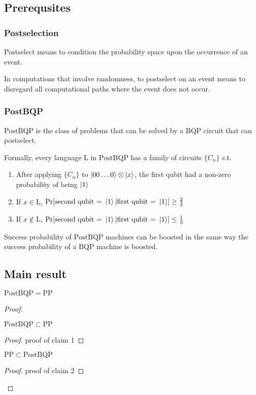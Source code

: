\documentclass[../main.tex]{subfiles}
\begin{document}
\subsection{Prerequsites}

\subsubsection{Postselection}

Postselect means to condition the probability space upon the occurrence of an event.

\noindent In computations that involve randomness, to postselect on an event means to disregard all computational paths where the event does not occur.

\subsubsection{PostBQP}

$\mathrm{PostBQP}$ is the class of problems that can be solved by a $\mathrm{BQP}$ circuit that can postselect.

Formally, every language $\mathrm{L}$ in $\mathrm{PostBQP}$ has a family of circuits $\{C_n\}$ s.t.
\begin{enumerate}
	\item After applying $\{C_n\}$ to $\ket{00\hdots 0}\otimes\ket{x}$, the first qubit had a non-zero probability of being $\ket{1}$
	\item If $x \in \mathrm{L}$, $\mathrm{Pr}[\text{second qubit = } \ket{1} | \text{first qubit = } \ket{1}] \ge \frac{2}{3}$
	\item If $x \not\in \mathrm{L}$, $\mathrm{Pr}[\text{second qubit = } \ket{1} | \text{first qubit = } \ket{1}] \le \frac{1}{3}$
\end{enumerate}

\noindent Success probability of $\mathrm{PostBQP}$ machines can be boosted in the same way the success probability of a $\mathrm{BQP}$ machine is boosted.

\subsection{Main result}

\begin{theorem}
	$\mathrm{PostBQP} = \mathrm{PP}$
\end{theorem}
\begin{proof}
	\begin{claim}
		$\mathrm{PostBQP} \subset \mathrm{PP}$
	\end{claim}
	\begin{proof}
		proof of claim 1
	\end{proof}
	\begin{claim}
		$\mathrm{PP} \subset \mathrm{PostBQP}$
	\end{claim}
	\begin{proof}
		proof of claim 2
	\end{proof}
\end{proof}
\end{document}
